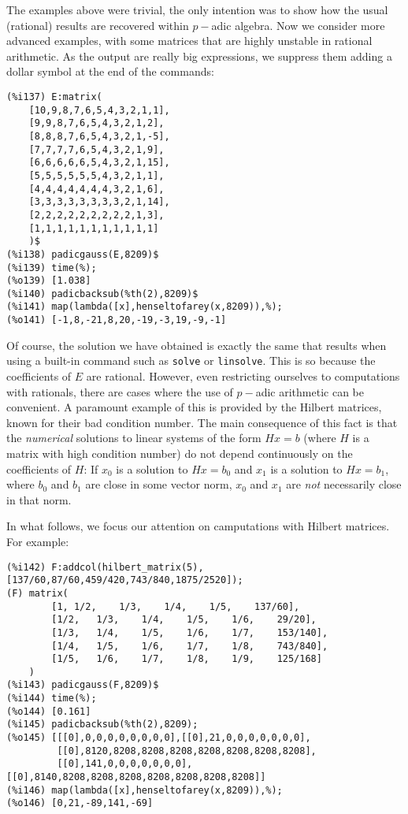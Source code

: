 \documentclass[fleqn]{cas-sc}
\begin{document}
The examples above were trivial, the only intention was to show
	how the usual (rational) results are recovered within $p-$adic algebra.
	Now we consider more advanced examples, with some matrices that
	are highly unstable in rational arithmetic. As the output are really
	big expressions, we suppress them adding a dollar symbol at the end of the commands:
	
\begin{verbatim}
(%i137)	E:matrix(
	[10,9,8,7,6,5,4,3,2,1,1],
	[9,9,8,7,6,5,4,3,2,1,2],
	[8,8,8,7,6,5,4,3,2,1,-5],
	[7,7,7,7,6,5,4,3,2,1,9],
	[6,6,6,6,6,5,4,3,2,1,15],
	[5,5,5,5,5,5,4,3,2,1,1],
	[4,4,4,4,4,4,4,3,2,1,6],
	[3,3,3,3,3,3,3,3,2,1,14],
	[2,2,2,2,2,2,2,2,2,1,3],
	[1,1,1,1,1,1,1,1,1,1,1]
	)$
(%i138)	padicgauss(E,8209)$
(%i139)	time(%);
(%o139)	[1.038]
(%i140)	padicbacksub(%th(2),8209)$
(%i141)	map(lambda([x],henseltofarey(x,8209)),%);
(%o141)	[-1,8,-21,8,20,-19,-3,19,-9,-1]
\end{verbatim}

Of course, the solution we have obtained is exactly the same that results
when using a built-in command such as \texttt{solve} or \texttt{linsolve}.
This is so because the coefficients of $E$ are rational. However, even 
restricting ourselves to computations with rationals, there are cases where
the use of $p-$adic arithmetic can be convenient. A paramount example of this
is provided by the Hilbert matrices, known for their bad condition number.
The main consequence of this fact is that the \emph{numerical} solutions to
linear systems of the form $Hx=b$ (where $H$ is a matrix with high condition
number) do not depend continuously on the coefficients of $H$: If $x_0$ is
a solution to $Hx=b_0$ and $x_1$ is a solution to $Hx=b_1$, where $b_0$ and $b_1$
are close in some vector norm, $x_0$ and $x_1$ are \emph{not} necessarily close in
that norm.

In what follows, we focus our attention on camputations with Hilbert matrices.
For example:

\begin{verbatim}
(%i142)	F:addcol(hilbert_matrix(5),[137/60,87/60,459/420,743/840,1875/2520]);
(F)	matrix(
		[1,	1/2,	1/3,	1/4,	1/5,	137/60],
		[1/2,	1/3,	1/4,	1/5,	1/6,	29/20],
		[1/3,	1/4,	1/5,	1/6,	1/7,	153/140],
		[1/4,	1/5,	1/6,	1/7,	1/8,	743/840],
		[1/5,	1/6,	1/7,	1/8,	1/9,	125/168]
	)
(%i143)	padicgauss(F,8209)$
(%i144)	time(%);
(%o144)	[0.161]
(%i145)	padicbacksub(%th(2),8209);
(%o145)	[[[0],0,0,0,0,0,0,0,0],[[0],21,0,0,0,0,0,0,0],
         [[0],8120,8208,8208,8208,8208,8208,8208,8208],
         [[0],141,0,0,0,0,0,0,0],[[0],8140,8208,8208,8208,8208,8208,8208,8208]]
(%i146)	map(lambda([x],henseltofarey(x,8209)),%);
(%o146)	[0,21,-89,141,-69]
\end{verbatim}
\end{document}
